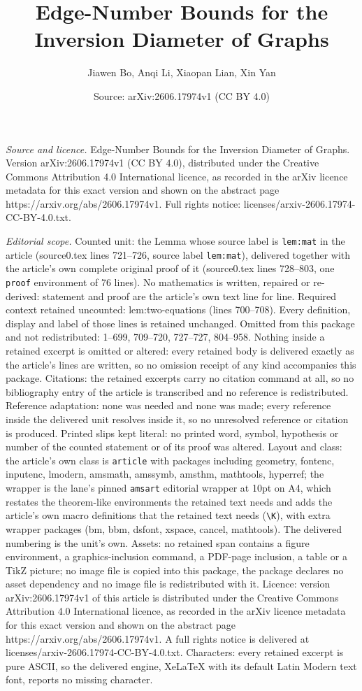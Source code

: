 \documentclass[10pt,a4paper]{amsart}
\title[Edge-Number Bounds for the Inversion Diameter of Graphs]{Edge-Number Bounds for the Inversion Diameter of Graphs}
\author{Jiawen Bo, Anqi Li, Xiaopan Lian, Xin Yan}
\date{Source: arXiv:2606.17974v1 (CC BY 4.0)}
\begin{document}
\maketitle

\noindent\emph{Source and licence.} Edge-Number Bounds for the Inversion Diameter of Graphs. Version arXiv:2606.17974v1 (CC BY 4.0), distributed under the Creative Commons Attribution 4.0 International licence, as recorded in the arXiv licence metadata for this exact version and shown on the abstract page https://arxiv.org/abs/2606.17974v1. Full rights notice: licenses/arxiv-2606.17974-CC-BY-4.0.txt.\par\smallskip

\noindent\textit{Editorial scope.} Counted unit: the Lemma whose source label is \texttt{lem:mat} in the article (source0.tex lines 721--726, source label \texttt{lem:mat}), delivered together with the article's own complete original proof of it (source0.tex lines 728--803, one \texttt{proof} environment of 76 lines). No mathematics is written, repaired or re-derived: statement and proof are the article's own text line for line. Required context retained uncounted: lem:two-equations (lines 700--708). Every definition, display and label of those lines is retained unchanged. Omitted from this package and not redistributed: 1--699, 709--720, 727--727, 804--958. Nothing inside a retained excerpt is omitted or altered: every retained body is delivered exactly as the article's lines are written, so no omission receipt of any kind accompanies this package. Citations: the retained excerpts carry no citation command at all, so no bibliography entry of the article is transcribed and no reference is redistributed. Reference adaptation: none was needed and none was made; every reference inside the delivered unit resolves inside it, so no unresolved reference or citation is produced. Printed slips kept literal: no printed word, symbol, hypothesis or number of the counted statement or of its proof was altered. Layout and class: the article's own class is \texttt{article} with packages including geometry, fontenc, inputenc, lmodern, amsmath, amssymb, amsthm, mathtools, hyperref; the wrapper is the lane's pinned \texttt{amsart} editorial wrapper at 10pt on A4, which restates the theorem-like environments the retained text needs and adds the article's own macro definitions that the retained text needs (\texttt{\textbackslash K}), with extra wrapper packages (bm, bbm, dsfont, xspace, cancel, mathtools). The delivered numbering is the unit's own. Assets: no retained span contains a figure environment, a graphics-inclusion command, a PDF-page inclusion, a table or a TikZ picture; no image file is copied into this package, the package declares no asset dependency and no image file is redistributed with it. Licence: version arXiv:2606.17974v1 of this article is distributed under the Creative Commons Attribution 4.0 International licence, as recorded in the arXiv licence metadata for this exact version and shown on the abstract page https://arxiv.org/abs/2606.17974v1. A full rights notice is delivered at licenses/arxiv-2606.17974-CC-BY-4.0.txt. Characters: every retained excerpt is pure ASCII, so the delivered engine, XeLaTeX with its default Latin Modern text font, reports no missing character.
\end{document}
